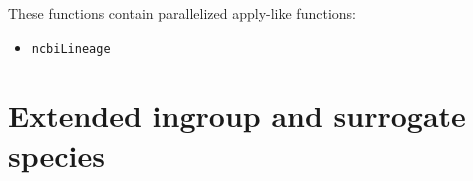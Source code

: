 \documentclass[12pt]{article}
\begin{document}
These functions contain parallelized apply-like functions:

\begin{itemize}
    \item \texttt{ncbiLineage}
\end{itemize}

\section{Extended ingroup and surrogate species}







\end{document}
